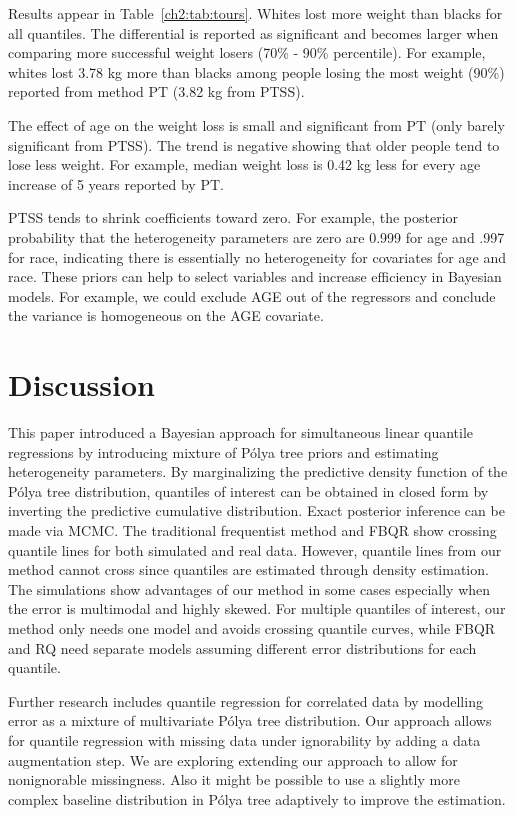\documentclass[12pt]{article}
\newcommand{\polya}{P\'{o}lya}
\begin{document}
Results appear in Table~\ref{ch2:tab:tours}.
Whites lost more weight than blacks for all quantiles.
The differential is reported as significant and becomes larger when comparing more successful weight losers (70\% - 90\% percentile).
For example, whites lost 3.78 kg more than blacks among people losing the most weight (90\%) reported from method PT (3.82 kg from PTSS).

The effect of age on the weight loss is small and significant from PT (only barely significant from PTSS).
The trend is negative showing that older people tend to lose less weight.
For example, median weight loss is 0.42 kg less for every age increase of 5 years reported by PT.

PTSS tends to shrink coefficients toward zero. For example, the
posterior probability that the heterogeneity parameters are zero are
0.999 for age and .997 for race, indicating there is essentially no
heterogeneity for covariates for age and race. These priors can help to select
variables and increase efficiency in Bayesian models. For example, we
could exclude AGE out of the regressors and conclude the variance is
homogeneous on the AGE covariate.


\section{Discussion}
\label{ch2:sec:discussion}
This paper introduced a Bayesian approach for simultaneous linear quantile regressions by introducing mixture of \polya{} tree priors and estimating heterogeneity parameters.
By marginalizing the predictive density function of the \polya{} tree distribution, quantiles of interest can be obtained in closed form by inverting the predictive cumulative distribution.
Exact posterior inference can be made via MCMC.
The traditional frequentist method and FBQR show crossing quantile lines for both simulated and real data.
However, quantile lines from our method cannot cross since quantiles are estimated through density estimation.
The simulations show advantages of our method in some cases especially when the error is multimodal and highly skewed.
For multiple quantiles of interest, our method only needs one model and avoids crossing quantile curves, while FBQR and RQ need separate models assuming different error distributions for each quantile.

Further research includes quantile regression for correlated data by modelling error as a mixture of multivariate \polya{} tree distribution.
Our approach allows for quantile regression with missing data under ignorability by adding a data augmentation step.
We are exploring extending our approach to allow for nonignorable missingness.
Also it might be possible to use a slightly more complex baseline distribution in \polya{} tree adaptively to improve the estimation.

 
\end{document}
